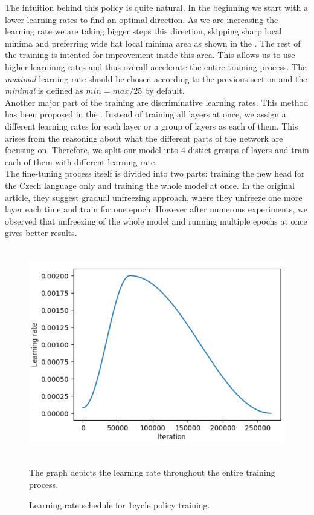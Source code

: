 The intuition behind this policy is quite natural. In the beginning we start with a lower learning rates to find an optimal direction. As we are increasing the learning rate we are taking bigger steps this direction, skipping sharp local minima and preferring wide flat local minima area as shown in the \citet{smith2019super}. The rest of the training is intented for improvement inside this area. This allows us to use higher learninng rates and thus overall accelerate the entire training process. The \textit{maximal} learning rate should be chosen according to the previous section and the \textit{minimal} is defined as $ min = max / 25$ by default.\\

Another major part of the training are discriminative learning rates. This method has been proposed in the \citet{howard2018universal}. Instead of training all layers at once, we assign a different learning rates for each layer or a group of layers as each of them. This arises from the reasoning about what the different parts of the network are focusing on. Therefore, we split our model into 4 distict groups of layers and train each of them with different learning rate.\\

The fine-tuning process itself is divided into two parts: training the new head for the Czech language only and training the whole model at once. In the original article, they suggest gradual unfreezing approach, where they unfreeze one more layer each time and train for one epoch. However after numerous experiments, we observed that unfreezing of the whole model and running multiple epochs at once gives better results.

\begin{figure}[h]\centering
\includegraphics[width=130mm, height=91mm]{../img/lrSchedule}
\caption{Learning rate schedule for 1cycle policy training.}
\label{fig03:lrSchedule}
The graph depicts the learning rate throughout the entire training process.
\end{figure}

